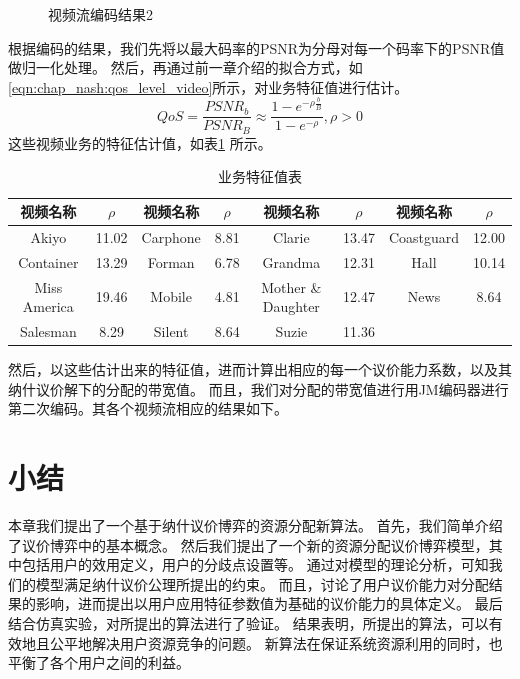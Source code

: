 \begin{figure}[tb]
\begin{minipage}[t]{0.5\linewidth}
    \caption{视频流编码结果2} 
    \label{fig:chap_nash:video_psnr2} 
  \end{minipage} 
\end{figure}

根据编码的结果，我们先将以最大码率的PSNR为分母对每一个码率下的PSNR值做归一化处理。
然后，再通过前一章介绍的拟合方式，如\eqref{eqn:chap_nash:qos_level_video}所示，对业务特征值进行估计。
\begin{equation}
QoS = \frac{PSNR_b}{PSNR_B} \approx \frac{1- e^{-\rho \frac{b}{B} }}{1-e^{-\rho}}, \rho > 0
\label{eqn:chap_nash:qos_level_video}
\end{equation}
这些视频业务的特征估计值，如表\ref{tab:chap_nash:rho_values} 所示。
\begin{table}[h]
    \wuhao
    \caption{业务特征值表}
    \centering
    \begin{tabular*}{0.98\textwidth}{cccccccc}
        \toprule
       视频名称 & $\rho$ &视频名称 & $\rho$ & 视频名称 & $\rho$ &视频名称 & $\rho$ \\
        \midrule
        Akiyo & 11.02 & Carphone & 8.81 & Clarie & 13.47 & Coastguard & 12.00 \\
        Container & 13.29 & Forman & 6.78 & Grandma & 12.31 & Hall &10.14 \\
        Miss America & 19.46 & Mobile  & 4.81 & Mother \&  Daughter & 12.47 & News & 8.64\\
        Salesman & 8.29 & Silent & 8.64 & Suzie & 11.36 & & \\
        \bottomrule
    \end{tabular*}
    \label{tab:chap_nash:rho_values}
\end{table}
然后，以这些估计出来的特征值，进而计算出相应的每一个议价能力系数，以及其纳什议价解下的分配的带宽值。
而且，我们对分配的带宽值进行用JM编码器进行第二次编码。其各个视频流相应的结果如下。



\section{小结}
本章我们提出了一个基于纳什议价博弈的资源分配新算法。
首先，我们简单介绍了议价博弈中的基本概念。
然后我们提出了一个新的资源分配议价博弈模型，其中包括用户的效用定义，用户的分歧点设置等。
通过对模型的理论分析，可知我们的模型满足纳什议价公理所提出的约束。
而且，讨论了用户议价能力对分配结果的影响，进而提出以用户应用特征参数值为基础的议价能力的具体定义。
最后结合仿真实验，对所提出的算法进行了验证。
结果表明，所提出的算法，可以有效地且公平地解决用户资源竞争的问题。
新算法在保证系统资源利用的同时，也平衡了各个用户之间的利益。


